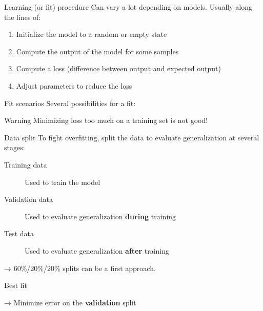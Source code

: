 \begin{frame}{Learning (or fit) procedure}
  Can vary a lot depending on models. Usually along the lines of:
  \begin{enumerate}
    \item Initialize the model to a random or empty state
    \item Compute the output of the model for some samples
    \item Compute a loss (difference between output and expected output)
    \item Adjust parameters to reduce the loss
  \end{enumerate}
\end{frame}

\begin{frame}{Fit scenarios}
  Several possibilities for a fit:


  \begin{alertblock}{Warning}
    Minimizing loss too much on a training set is not good!
  \end{alertblock}
\end{frame}

\begin{frame}{Data split}
  To fight overfitting, split the data to evaluate generalization at several stages:
  \begin{description}
  \item[Training data] Used to train the model
  \item[Validation data] Used to evaluate generalization \textbf{during} training
  \item[Test data] Used to evaluate generalization \textbf{after} training
  \end{description}
  → 60\%/20\%/20\% splits can be a first approach.
\end{frame}

\begin{frame}{Best fit}


  → Minimize error on the \textbf{validation} split
\end{frame}
